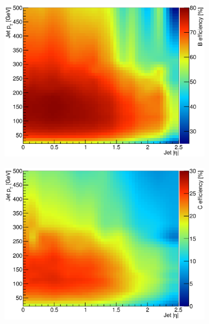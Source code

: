 \begin{figure}[tb!] %
\centering
\begin{subfigure}[t]{0.45\textwidth}
   \includegraphics[width=0.99\textwidth]{Objects/Figures/eff_b.eps} %
\caption{}
\end{subfigure}
\begin{subfigure}[t]{0.45\textwidth}
   \includegraphics[width=0.99\textwidth]{Objects/Figures/eff_c.eps} %
   \caption{}
\end{subfigure}
\begin{subfigure}[t]{0.45\textwidth}

\end{subfigure}
\end{figure}
